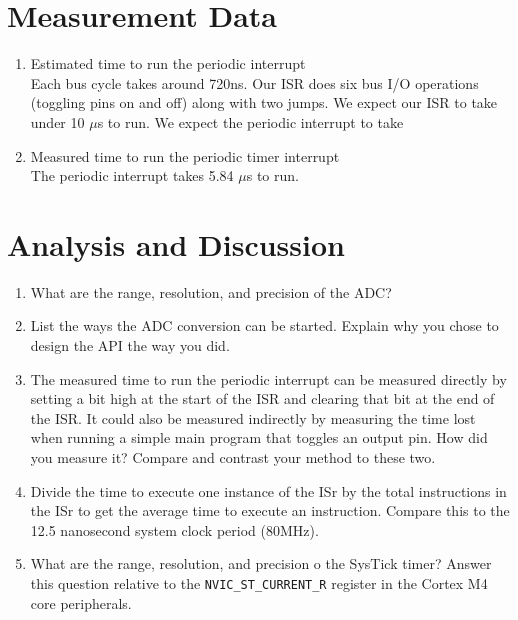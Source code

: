 \documentclass[12pt]{article}
\begin{document}
\section{Measurement Data}
\begin{enumerate}[1)]
  \item Estimated time to run the periodic interrupt \\
    Each bus cycle takes around 720ns. Our ISR does six bus I/O
    operations (toggling pins on and off) along with two jumps. We
    expect our ISR to take under 10 $\mu$s to run.
    We expect the periodic interrupt to take
  \item Measured time to run the periodic timer interrupt \\
    The periodic interrupt takes 5.84 $\mu$s to run.
  \end{enumerate}
\section{Analysis and Discussion}
\begin{enumerate}[1)]
  \item What are the range, resolution, and precision of the ADC?
  \item List the ways the ADC conversion can be started. Explain why
    you chose to design the API the way you did.
  \item The measured time to run the periodic interrupt can be
    measured directly by setting a bit high at the start of the ISR
    and clearing that bit at the end of the ISR. It could also be
    measured indirectly by measuring the time lost when running a
    simple main program that toggles an output pin. How did you measure
    it? Compare and contrast your method to these two.
  \item Divide the time to execute one instance of the ISr by the
    total instructions in the ISr to get the average time to execute
    an instruction. Compare this to the 12.5 nanosecond system clock
    period (80MHz).
  \item What are the range, resolution, and precision o the SysTick
    timer? Answer this question relative to the
    \verb|NVIC_ST_CURRENT_R| register in the Cortex M4 core peripherals.
\end{enumerate}
\end{document}
